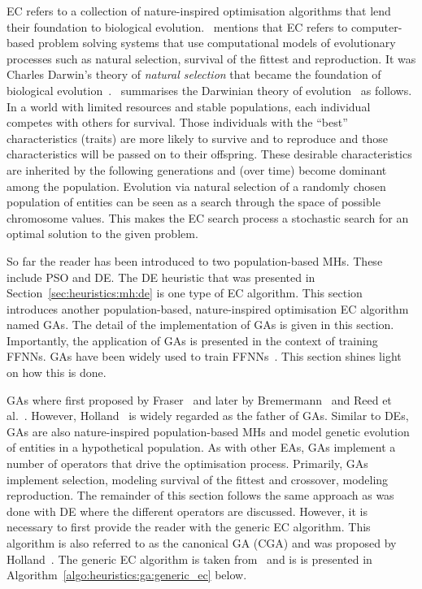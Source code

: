 \Ac{EC} refers to a collection of nature-inspired optimisation algorithms that lend their foundation to biological evolution.~\citeauthor{ref:engelbrecht:2007}\cite{ref:engelbrecht:2007} mentions that \ac{EC} refers to computer-based problem solving systems that use computational models of evolutionary processes such as natural selection, survival of the fittest and reproduction. It was Charles Darwin's theory of \textit{natural selection} that became the foundation of biological evolution~\cite{ref:darwin:1987}.~\citeauthor{ref:engelbrecht:2007}\cite{ref:engelbrecht:2007} summarises the Darwinian theory of evolution~\cite{ref:darwin:2012} as follows. In a world with limited resources and stable populations, each individual competes with others for survival. Those individuals with the ``best'' characteristics (traits) are more likely to survive and to reproduce and those characteristics will be passed on to their offspring. These desirable characteristics are inherited by the following generations and (over time) become dominant among the population. Evolution via natural selection of a randomly chosen population of entities can be seen as a search through the space of possible chromosome values. This makes the \acs{EC} search process a stochastic search for an optimal solution to the given problem.

So far the reader has been introduced to two population-based \acp{MH}. These include \ac{PSO} and \ac{DE}. The \ac{DE} heuristic that was presented in Section~\ref{sec:heuristics:mh:de} is one type of \ac{EC} algorithm. This section introduces another population-based, nature-inspired optimisation \ac{EC} algorithm named \aclp{GA}. The detail of the implementation of \acp{GA} is given in this section. Importantly, the application of \acp{GA} is presented in the context of training \acp{FFNN}. \acp{GA} have been widely used to train \acp{FFNN}~\cite{ref:montana:1989}\cite{ref:siddique:2001}\cite{ref:miller:1989}. This section shines light on how this is done.

\Acp{GA} where first proposed by Fraser~\cite{ref:fraser:1957} and later by Bremermann~\cite{ref:bremermann:1962} and Reed et al.~\cite{ref:reed:1967}. However, Holland~\cite{ref:holland:1992} is widely regarded as the father of \acp{GA}. Similar to \acp{DE}, \acp{GA} are also nature-inspired population-based \acp{MH} and model genetic evolution of entities in a hypothetical population. As with other \acp{EA}, \acp{GA} implement a number of operators that drive the optimisation process.  Primarily, \acp{GA} implement selection, modeling survival of the fittest and crossover, modeling reproduction. The remainder of this section follows the same approach as was done with \ac{DE} where the different operators are discussed. However, it is necessary to first provide the reader with the generic \ac{EC} algorithm. This algorithm is also referred to as the canonical \ac{GA} (CGA) and was proposed by Holland~\cite{ref:holland:1992}. The generic \ac{EC} algorithm is taken from~\cite{ref:engelbrecht:2007} and is is presented in Algorithm~\ref{algo:heuristics:ga:generic_ec} below.

